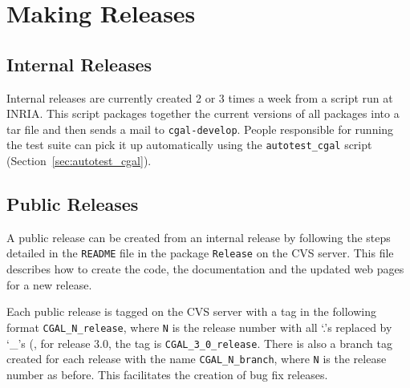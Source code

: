 \chapter{Making Releases}
\label{chap:releases}

\section{Internal Releases}
\label{sec:internal_releases}

Internal releases are currently created 2 or 3 times a week from a script run
at INRIA.  This script packages together the current versions of all
packages into a tar file and then sends a mail to {\tt cgal-develop}.
People responsible for running the test suite can pick it up automatically
using the {\tt autotest\_cgal} script (Section~\ref{sec:autotest_cgal}).

\section{Public Releases}
\label{sec:public_releases}

A public release can be created from an internal release by following the
steps detailed in the
\texttt{README} file in the package \texttt{Release} on the CVS server.
This file describes how to create the code, the documentation and the
updated web pages for a new release.

Each public release is tagged on the CVS server with a tag in the following
format \texttt{CGAL\_N\_release}, where \texttt{N} is the release number
with all `.'s replaced by `\_'s (\eg, for release 3.0, the tag is
\texttt{CGAL\_3\_0\_release}.  There is also a branch tag created for
each release with the name \texttt{CGAL\_N\_branch}, where \texttt{N} is
the release number as before.  This facilitates the creation of bug fix
releases.

